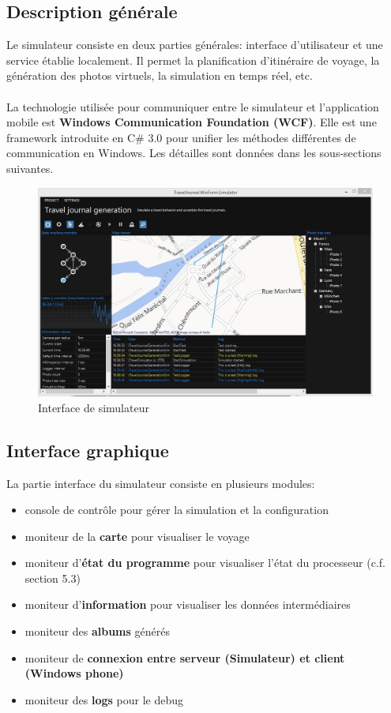 \documentclass{article}
\begin{document}
\subsection{\Large Description générale}
Le simulateur consiste en deux parties générales: interface d'utilisateur et une service établie localement. Il permet la planification d'itinéraire de voyage, la génération des photos virtuels, la simulation en temps réel, etc.
\\\\
La technologie utilisée pour communiquer entre le simulateur et l'application mobile est \textbf{Windows Communication Foundation (WCF)}. Elle est une framework introduite en C\# 3.0 pour unifier les méthodes différentes de communication en Windows. Les détailles sont données dans les sous-sections suivantes. 
\begin{figure}[h!]
\centering
\includegraphics[width=160mm]{SIMU.jpg}
\caption{Interface de simulateur}
\end{figure}

\vspace{0.2 cm}
\subsection{\Large Interface graphique}
La partie interface du simulateur consiste en plusieurs modules:
\begin{itemize}
\item console de contrôle pour gérer la simulation et la configuration
\item moniteur de la \textbf{carte} pour visualiser le voyage
\item moniteur d'\textbf{état du programme} pour visualiser l'état du processeur (c.f. section 5.3) 
\item moniteur d'\textbf{information} pour visualiser les données intermédiaires
\item moniteur des \textbf{albums} générés
\item moniteur de \textbf{connexion entre serveur (Simulateur) et client (Windows phone)}
\item moniteur des \textbf{logs} pour le debug
\end{itemize}
\end{document}
